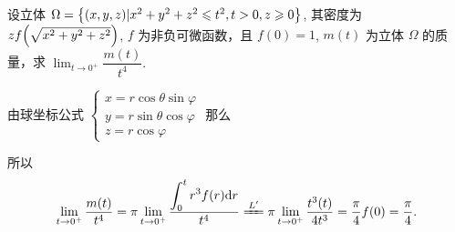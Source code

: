 \begin{example}
    设立体 $\Omega=\qty{(x, y, z)|x^2+y^2+z^2\leqslant t^2,t>0,z\geqslant 0}$, 其密度为 $zf\qty(\sqrt{x^2+y^2+z^2})$, $f$ 为非负可微函数，且 $f(0)=1$, $m(t)$ 为立体 $\Omega$ 的质量，求 $\displaystyle \lim_{t \to 0^+}\dfrac{m(t)}{t^4}.$
\end{example}
\begin{solution}
    由球坐标公式 $\begin{cases}
            x=r\cos\theta\sin\varphi \\ y=r\sin\theta\cos\varphi\\ z= r\cos\varphi
        \end{cases}$ 那么
    所以 $$
        \lim_{t \to 0^+}\dfrac{m(t)}{t^4}=\pi \lim_{t \to 0^+}\dfrac{\displaystyle \int_{0}^{t} r^3f(r) \dd r}{t^4}\xlongequal{L'}\pi\lim_{t \to 0^+}\dfrac{t^3(t)}{4t^3}=\frac{\pi}{4} f(0) =\dfrac{\pi}{4}.
    $$
\end{solution}


